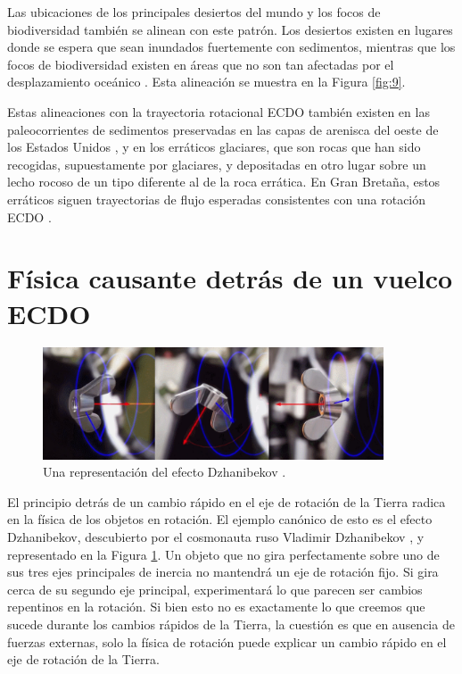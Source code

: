\documentclass[10pt,twocolumn,letterpaper]{article}
\begin{document}
Las ubicaciones de los principales desiertos del mundo y los focos de biodiversidad también se alinean con este patrón. Los desiertos existen en lugares donde se espera que sean inundados fuertemente con sedimentos, mientras que los focos de biodiversidad existen en áreas que no son tan afectadas por el desplazamiento oceánico \cite{28}. Esta alineación se muestra en la Figura \ref{fig:9}.

Estas alineaciones con la trayectoria rotacional ECDO también existen en las paleocorrientes de sedimentos preservadas en las capas de arenisca del oeste de los Estados Unidos \cite{21}, y en los erráticos glaciares, que son rocas que han sido recogidas, supuestamente por glaciares, y depositadas en otro lugar sobre un lecho rocoso de un tipo diferente al de la roca errática. En Gran Bretaña, estos erráticos siguen trayectorias de flujo esperadas consistentes con una rotación ECDO \cite{67,68}.

\section{Física causante detrás de un vuelco ECDO}

\begin{figure}
\begin{center}

\includegraphics[width=0.9\textwidth]{dzhani.jpg}
\end{center}
   \caption{Una representación del efecto Dzhanibekov \cite{28}.}
\label{fig:10}
\end{figure}

El principio detrás de un cambio rápido en el eje de rotación de la Tierra radica en la física de los objetos en rotación. El ejemplo canónico de esto es el efecto Dzhanibekov, descubierto por el cosmonauta ruso Vladimir Dzhanibekov \cite{37}, y representado en la Figura \ref{fig:10}. Un objeto que no gira perfectamente sobre uno de sus tres ejes principales de inercia no mantendrá un eje de rotación fijo. Si gira cerca de su segundo eje principal, experimentará lo que parecen ser cambios repentinos en la rotación. Si bien esto no es exactamente lo que creemos que sucede durante los cambios rápidos de la Tierra, la cuestión es que en ausencia de fuerzas externas, solo la física de rotación puede explicar un cambio rápido en el eje de rotación de la Tierra.
\end{document}
